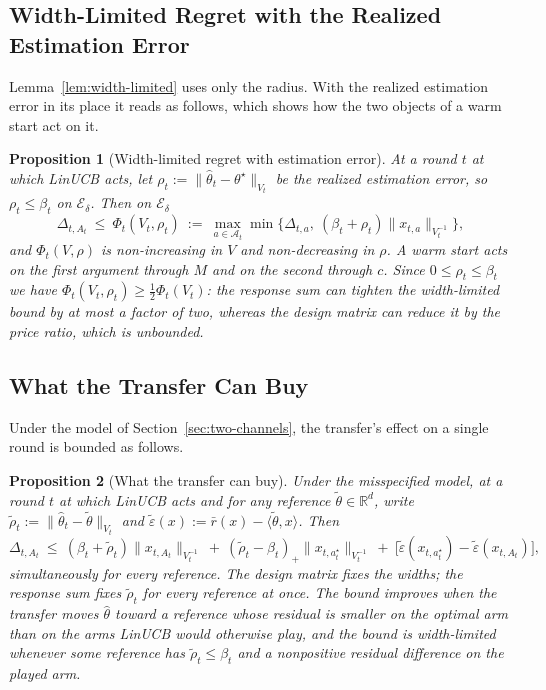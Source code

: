\documentclass{article}
\newtheorem{proposition}{Proposition}
\theoremstyle{definition}
\theoremstyle{remark}
\newcommand{\R}{\mathbb{R}}
\theoremstyle{remark}
\begin{document}
\subsection{Width-Limited Regret with the Realized Estimation Error}
\label{app:two-objects}

Lemma~\ref{lem:width-limited} uses only the radius. With the realized
estimation error in its place it reads as follows, which shows how the two
objects of a warm start act on it.

\begin{proposition}[Width-limited regret with estimation error]
\label{prop:two-channel}
At a round $t$ at which LinUCB acts, let
$\rho_t:=\|\widehat\theta_t-\theta^\star\|_{V_t}$ be the realized estimation
error, so $\rho_t\le\beta_t$ on $\mathcal E_\delta$. Then on $\mathcal E_\delta$
\begin{equation}
\label{eq:phi-two}
\Delta_{t,A_t}\ \le\ \Phi_t(V_t,\rho_t)\ :=\
\max_{a\in\mathcal A_t}\min\bigl\{\Delta_{t,a},\ (\beta_t+\rho_t)\|x_{t,a}\|_{V_t^{-1}}\bigr\},
\end{equation}
and $\Phi_t(V,\rho)$ is non-increasing in $V$ and non-decreasing in $\rho$. A warm start acts
on the first argument through $M$ and on the second through $c$. Since
$0\le\rho_t\le\beta_t$ we have $\Phi_t(V_t,\rho_t)\ge\tfrac12\Phi_t(V_t)$: the
response sum can tighten the width-limited bound by at most a factor of two,
whereas the design matrix can reduce it by the price ratio, which is unbounded.
\end{proposition}

\subsection{What the Transfer Can Buy}
\label{app:transfer-regret}

Under the model of Section~\ref{sec:two-channels}, the transfer's effect on a
single round is bounded as follows.

\begin{proposition}[What the transfer can buy]
\label{prop:transfer-regret}
Under the misspecified model, at a round $t$ at which LinUCB acts and for any
reference $\widetilde\theta\in\R^d$, write
$\widetilde\rho_t:=\|\widehat\theta_t-\widetilde\theta\|_{V_t}$ and
$\widetilde\varepsilon(x):=\bar r(x)-\langle\widetilde\theta,x\rangle$. Then
\[
\Delta_{t,A_t}\ \le\ (\beta_t+\widetilde\rho_t)\|x_{t,A_t}\|_{V_t^{-1}}
\ +\ (\widetilde\rho_t-\beta_t)_+\|x_{t,a^\star_t}\|_{V_t^{-1}}
\ +\ \bigl[\widetilde\varepsilon(x_{t,a^\star_t})-\widetilde\varepsilon(x_{t,A_t})\bigr],
\]
simultaneously for every reference. The design matrix fixes the widths; the
response sum fixes $\widetilde\rho_t$ for every reference at once. The
bound improves when the transfer moves $\widehat\theta$ toward a reference whose
residual is smaller on the optimal arm than on the arms LinUCB would otherwise
play, and the bound is width-limited whenever some reference has
$\widetilde\rho_t\le\beta_t$ and a nonpositive residual difference on the
played arm.
\end{proposition}
\end{document}
